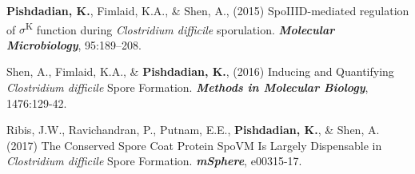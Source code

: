 \documentclass[letterpaper]{scrartcl}
\begin{document}
\begin{list1}
\item \textbf{Pishdadian, K.}, Fimlaid, K.A., \& Shen, A., (2015) SpoIIID-mediated regulation of $\sigma$\textsuperscript{K} function during \emph{Clostridium difficile} sporulation. \textbf{\emph{Molecular Microbiology}}, 95:189--208.
\item Shen, A., Fimlaid, K.A., \& \textbf{Pishdadian, K.}, (2016) Inducing and Quantifying \emph{Clostridium difficile} Spore Formation. \textbf{\emph{Methods in Molecular Biology}}, 1476:129-42.
\item Ribis, J.W., Ravichandran, P., Putnam, E.E., \textbf{Pishdadian, K.}, \& Shen, A. (2017) The Conserved Spore Coat Protein SpoVM Is Largely Dispensable in \emph{Clostridium difficile} Spore Formation. \textbf{\emph{mSphere}}, e00315-17.
\end{list1}

%
%
\end{document}
